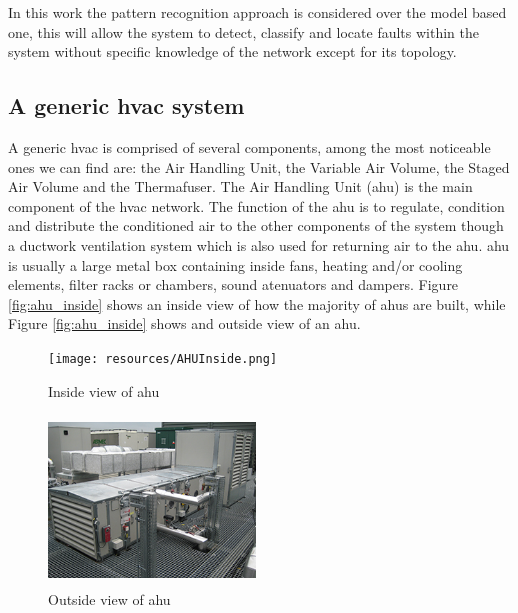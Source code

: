 In this work the pattern recognition approach is considered over the model based one, this will allow the system to detect, classify and locate faults within the system without specific knowledge of the network except for its topology.

\subsection{A generic \gls{hvac} system}

A generic \gls{hvac} is comprised of several components, among the most noticeable ones we can find are: the Air Handling Unit, the Variable Air Volume, the Staged Air Volume and the Thermafuser.  The Air Handling Unit (\gls{ahu}) is the main component of the \gls{hvac} network. The function of the \gls{ahu} is to regulate, condition and distribute the conditioned air to the other components of the system though  a ductwork ventilation system which is also used for returning air to the \gls{ahu}. \gls{ahu} is usually a large metal box containing inside fans, heating and/or cooling elements, filter racks or chambers, sound atenuators and dampers. Figure \ref{fig:ahu_inside} shows an inside view of how the majority of \gls{ahu}s are built, while Figure \ref{fig:ahu_inside} shows and outside view of an \gls{ahu}.

\begin{figure}[H]
	\centering
		\begin{minipage}{.5\textwidth}
 			 \centering
  			\texttt{[image: resources/AHUInside.png]}
  			\caption{Inside view of \gls{ahu}}
 			 \label{fig:ahu_inside}
		\end{minipage}%
		\begin{minipage}{.5\textwidth}
  			\centering
  			\includegraphics[width=55mm, height=45mm]{resources/AHUOutside.png}
  			\caption{Outside view of \gls{ahu}}
  			\label{fig:ahu_outside}
		\end{minipage}
\end{figure}

